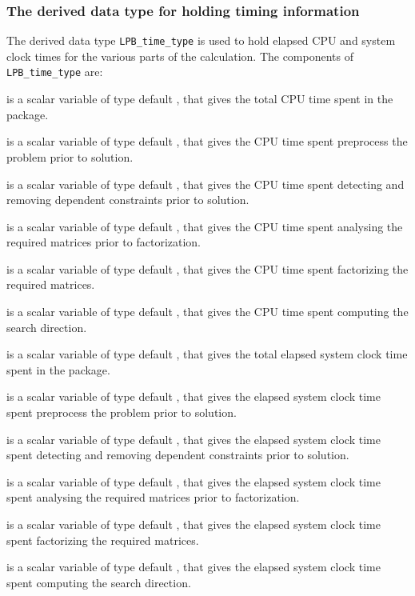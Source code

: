 \documentclass{galahad}
\newcommand{\packagename}{LPB}
\begin{document}



\subsubsection{The derived data type for holding timing
 information}\label{typetime}
The derived data type
{\tt \packagename\_time\_type}
is used to hold elapsed CPU and system clock times for the various parts of
the calculation. The components of
{\tt \packagename\_time\_type}
are:
\begin{description}
 is a scalar variable of type default \realdp, that gives
 the total CPU time spent in the package.

 is a scalar variable of type default \realdp, that gives
 the CPU time spent preprocess the problem prior to solution.

 is a scalar variable of type default \realdp, that gives
 the CPU time spent detecting and removing dependent constraints prior
to solution.

 is a scalar variable of type default \realdp, that gives
 the CPU time spent analysing the required matrices prior to factorization.

 is a scalar variable of type default \realdp, that gives
 the CPU time spent factorizing the required matrices.

 is a scalar variable of type default \realdp, that gives
 the CPU time spent computing the search direction.

 is a scalar variable of type default \realdp, that gives
 the total elapsed system clock time spent in the package.

 is a scalar variable of type default \realdp, that gives
 the elapsed system clock time spent preprocess the problem prior to solution.

 is a scalar variable of type default \realdp,
that gives  the elapsed system clock time spent detecting and removing
dependent constraints prior to solution.

 is a scalar variable of type default \realdp, that gives
 the elapsed system clock time spent analysing the required matrices prior to
factorization.

 is a scalar variable of type default \realdp, that gives
 the elapsed system clock time spent factorizing the required matrices.

 is a scalar variable of type default \realdp, that gives
 the elapsed system clock time spent computing the search direction.

\end{description}
\end{document}
